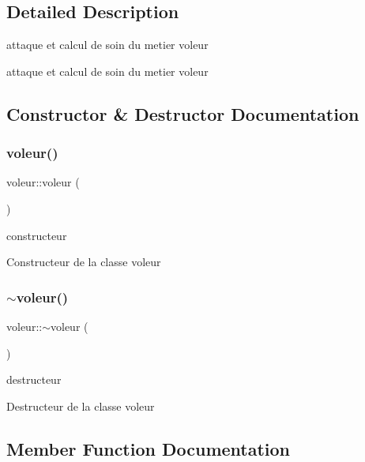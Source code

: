 \subsection{Detailed Description}
attaque et calcul de soin du metier voleur 

attaque et calcul de soin du metier voleur 

\subsection{Constructor \& Destructor Documentation}
\mbox{\label{classvoleur_aa41df8072eee3f5d930590677e0241ca}} 
\subsubsection{\texorpdfstring{voleur()}{voleur()}}
{\footnotesize\ttfamily voleur\+::voleur (\begin{DoxyParamCaption}{ }\end{DoxyParamCaption})}



constructeur 

Constructeur de la classe voleur \mbox{\label{classvoleur_a4b5410d4e26256dc4d167520ee6f1b2e}} 
\subsubsection{\texorpdfstring{$\sim$voleur()}{~voleur()}}
{\footnotesize\ttfamily voleur\+::$\sim$voleur (\begin{DoxyParamCaption}{ }\end{DoxyParamCaption})}



destructeur 

Destructeur de la classe voleur 

\subsection{Member Function Documentation}
\mbox{\label{classvoleur_a3c35701899c8774ce1ae9998983a37b4}} 
